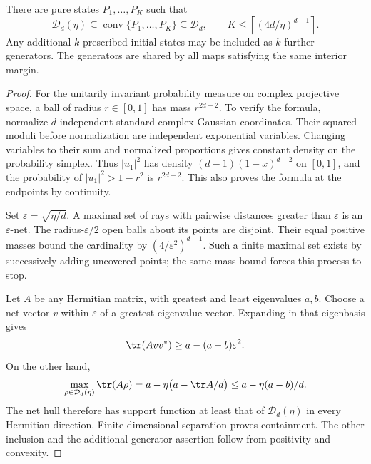 \begin{lemma}\label{lem:r68-hull}
There are pure states $P_1,\ldots,P_K$ such that
\begin{equation}\label{eq:r68-hull}
 \mathcal D_d(\eta)\subseteq\operatorname{conv}\{P_1,\ldots,P_K\}
              \subseteq\mathcal D_d,
 \qquad K\le\left\lceil(4d/\eta)^{d-1}\right\rceil.
\end{equation}
Any additional $k$ prescribed initial states may be included as $k$ further generators. The generators are shared by all maps satisfying the same interior margin.
\end{lemma}
\begin{proof}
For the unitarily invariant probability measure on complex projective space, a ball of radius $r\in[0,1]$ has mass $r^{2d-2}$. To verify the formula, normalize $d$ independent standard complex Gaussian coordinates. Their squared moduli before normalization are independent exponential variables. Changing variables to their sum and normalized proportions gives constant density on the probability simplex. Thus $|u_1|^2$ has density $(d-1)(1-x)^{d-2}$ on $[0,1]$, and the probability of $|u_1|^2>1-r^2$ is $r^{2d-2}$. This also proves the formula at the endpoints by continuity.

Set $\varepsilon=\sqrt{\eta/d}$. A maximal set of rays with pairwise distances greater than $\varepsilon$ is an $\varepsilon$-net. The radius-$\varepsilon/2$ open balls about its points are disjoint. Their equal positive masses bound the cardinality by $(4/\varepsilon^2)^{d-1}$. Such a finite maximal set exists by successively adding uncovered points; the same mass bound forces this process to stop.

Let $A$ be any Hermitian matrix, with greatest and least eigenvalues $a,b$. Choose a net vector $v$ within $\varepsilon$ of a greatest-eigenvalue vector. Expanding in that eigenbasis gives
\[
 \tr(Avv^*)\ge a-(a-b)\varepsilon^2.
\]
On the other hand,
\[
 \max_{\rho\in\mathcal D_d(\eta)}\tr(A\rho)
 =a-\eta\bigl(a-\tr A/d\bigr)
 \le a-\eta(a-b)/d.
\]
The net hull therefore has support function at least that of $\mathcal D_d(\eta)$ in every Hermitian direction. Finite-dimensional separation proves containment. The other inclusion and the additional-generator assertion follow from positivity and convexity.
\end{proof}

